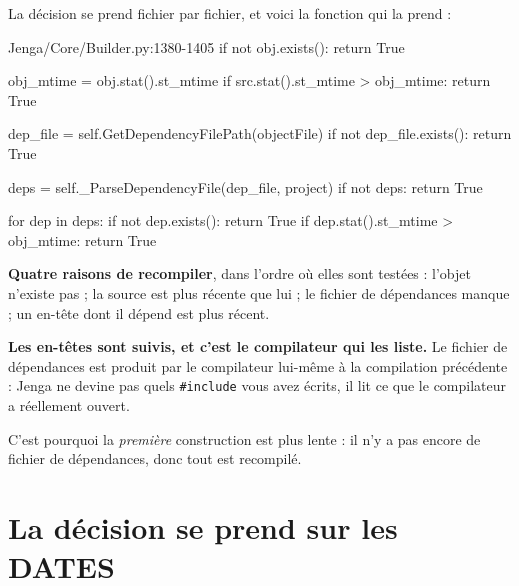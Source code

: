 \begin{nkretenir}
La décision se prend fichier par fichier, et voici la fonction qui la prend :

\begin{nkcode}{Jenga/Core/Builder.py:1380-1405}
if not obj.exists():
    return True

obj_mtime = obj.stat().st_mtime
if src.stat().st_mtime > obj_mtime:
    return True

dep_file = self.GetDependencyFilePath(objectFile)
if not dep_file.exists():
    return True

deps = self._ParseDependencyFile(dep_file, project)
if not deps:
    return True

for dep in deps:
    if not dep.exists():
        return True
    if dep.stat().st_mtime > obj_mtime:
        return True
\end{nkcode}

\textbf{Quatre raisons de recompiler}, dans l'ordre où elles sont testées :
l'objet n'existe pas ; la source est plus récente que lui ; le fichier de
dépendances manque ; un en-tête dont il dépend est plus récent.
\end{nkretenir}

\begin{nkretenir}
\textbf{Les en-têtes sont suivis, et c'est le compilateur qui les liste.} Le
fichier de dépendances est produit par le compilateur lui-même à la compilation
précédente : Jenga ne devine pas quels \texttt{\#include} vous avez écrits, il
lit ce que le compilateur a réellement ouvert.

C'est pourquoi la \emph{première} construction est plus lente : il n'y a pas
encore de fichier de dépendances, donc tout est recompilé.
\end{nkretenir}

\section{La décision se prend sur les DATES}

